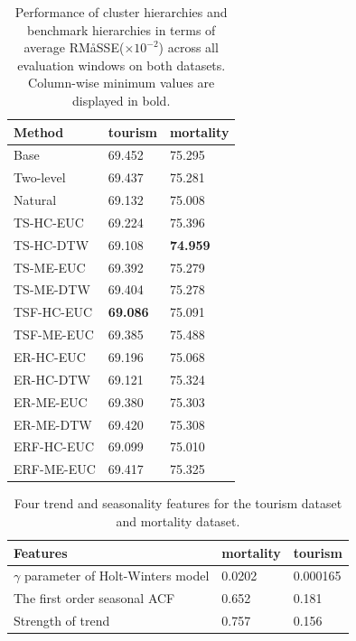 \documentclass[a4paper,review,12pt,authoryear]{elsarticle}
\begin{document}
\begin{table}[h!]
    \centering
    \caption{\label{tab:P3_rmsse}Performance of cluster hierarchies and benchmark hierarchies in terms of average RMåSSE($\times 10^{-2}$) across all evaluation windows on both datasets. Column-wise minimum values are displayed in bold.}
    \begin{tabular}{lll}
    \toprule
        Method & tourism & mortality \\ \midrule
        Base & 69.452 & 75.295 \\ 
        Two-level & 69.437 & 75.281 \\ 
        Natural & 69.132 & 75.008 \\ 
        TS-HC-EUC & 69.224 & 75.396 \\ 
        TS-HC-DTW & 69.108 & \textbf{74.959} \\ 
        TS-ME-EUC & 69.392 & 75.279 \\ 
        TS-ME-DTW & 69.404 & 75.278 \\ 
        TSF-HC-EUC & \textbf{69.086} & 75.091 \\ 
        TSF-ME-EUC & 69.385 & 75.488 \\ 
        ER-HC-EUC & 69.196 & 75.068 \\ 
        ER-HC-DTW & 69.121 & 75.324 \\ 
        ER-ME-EUC & 69.380 & 75.303 \\ 
        ER-ME-DTW & 69.420 & 75.308 \\ 
        ERF-HC-EUC & 69.099 & 75.010 \\ 
        ERF-ME-EUC & 69.417 & 75.325 \\ \bottomrule
    \end{tabular}
\end{table}


\begin{table}[!ht]
    \centering
    \caption{\label{tab:P3_features}Four trend and seasonality features for the tourism dataset and mortality dataset.}
    \begin{tabular}{lll}\toprule
        Features & mortality & tourism \\ \midrule
        $\gamma$ parameter of Holt-Winters model & 0.0202 & 0.000165 \\ 
        The first order seasonal ACF & 0.652 & 0.181 \\ 
        Strength of trend & 0.757 & 0.156 \\ \bottomrule
    \end{tabular}
\end{table}
\end{document}
